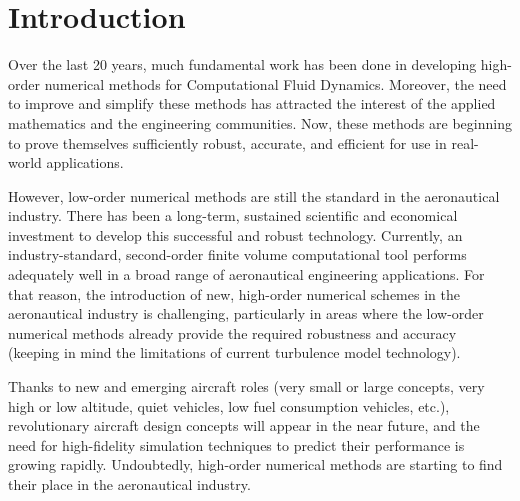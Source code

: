 
\section{Introduction}

Over the last 20 years, much fundamental work has been done in developing high-order numerical methods for Computational Fluid Dynamics. Moreover, the need to improve and simplify these methods has attracted the interest of the applied mathematics and the engineering communities. Now, these methods are beginning to prove themselves sufficiently robust, accurate, and efficient for use in real-world applications.

However, low-order numerical methods are still the standard in the aeronautical industry. There has been a long-term, sustained scientific and economical investment to develop this successful and robust technology. Currently, an industry-standard, second-order finite volume computational tool performs adequately well in a broad range of aeronautical engineering applications. For that reason, the introduction of new, high-order numerical schemes in the aeronautical industry is challenging, particularly in areas where the low-order numerical methods already provide the required robustness and accuracy (keeping in mind the limitations of current turbulence model technology).

Thanks to new and emerging aircraft roles (very small or large concepts, very high or low altitude, quiet vehicles, low fuel consumption vehicles, etc.), revolutionary aircraft design concepts will appear in the near future, and the need for high-fidelity simulation techniques to predict their performance is growing rapidly. Undoubtedly, high-order numerical methods are starting to find their place in the aeronautical industry. 

